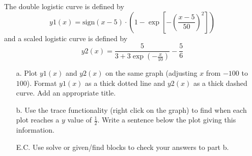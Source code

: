 {The double logistic curve is defined by 
\[
y1(x)=\textrm{sign}(x-5)\cdot\left(1-\exp\left[-\left(\frac{x-5}{50}\right)^2\right]\right)
\]
and a scaled logistic curve is defined by
\[
y2(x)=\frac{5}{3+3\exp\left(-\frac{x}{10}\right)} - \frac{5}{6}
\]
\begin{enumerate}
\item[a.] Plot $y1(x)$ and $y2(x)$ on the same graph (adjusting $x$ from $-100$ to $100$).  Format $y1(x)$ as a thick dotted line and $y2(x)$ as a thick dashed curve. Add an appropriate title.
\item[b.] Use the trace functionality (right click on the graph) to find when each plot reaches a $y$ value of $\frac{1}{2}$.  Write a sentence below the plot giving this information.
\item[E.C.] Use solve or given/find blocks to check your answers to part b.
\end{enumerate}
}
{}
